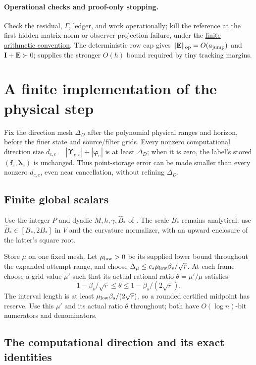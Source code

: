 \documentclass[11pt]{article}
\theoremstyle{remark}
\newcommand{\II}{\mathbf I}
\newcommand{\ff}{\mathbf f}
\newcommand{\llambda}{\boldsymbol{\lambda}}
\newcommand{\UUps}{\boldsymbol{\Upsilon}}
\newcommand{\EE}{\mathbf E}
\newcommand{\pphi}{\boldsymbol{\varphi}}
\newcommand{\norm}[1]{\lVert#1\rVert}
\begin{document}
\paragraph{Operational checks and proof-only stopping.}
Check the residual, $\Gamma$, ledger, and work operationally; kill the reference
at the first hidden matrix-norm or observer-projection failure, under the
\hyperref[par:ram30-finite-arithmetic]{finite arithmetic convention}.
The deterministic row cap gives $\norm{\EE}_{\rm op}=O(a_{\rm jump})$ and
$\II+\EE\succ0$;  supplies the stronger $O(h)$ bound
required by tiny tracking margins.

\section{A finite implementation of the physical step}
\label{sec:ram-finite-direction}

Fix the direction mesh $\Delta_D$ after the polynomial physical ranges and
horizon, before the finer state and source/filter grids.
Every nonzero computational direction size $d_{c,e}=|\UUps_{c,e}|+|\pphi_e|$ is at
least $\Delta_D$; when it is zero, the label's stored $(\ff_e,\llambda_e)$ is
unchanged.
Thus point-storage error can be made smaller than every nonzero $d_{c,e}$, even
near cancellation, without refining $\Delta_D$.

\subsection{Finite global scalars}

Use the integer $P$ and dyadic $M,h,\gamma,\widehat B_*$ of
.
The scale $B_*$ remains analytical: use $\widehat B_*\in[B_*,2B_*]$ in $V$ and
the curvature normalizer, with an upward enclosure of the latter's square root.

Store $\mu$ on one fixed mesh.
Let $\mu_{\rm low}>0$ be its supplied lower bound throughout the expanded
attempt range, and choose $\Delta_\mu\le c_\star\mu_{\rm low}\beta_s/\sqrt r$.
At each frame choose a grid value $\mu'$ such that its actual rational ratio
$\theta=\mu'/\mu$ satisfies
\[
 1-\beta_s/\sqrt r\le\theta
           \le1-\beta_s/(2\sqrt r).
\]
The interval length is at least $\mu_{\rm low}\beta_s/(2\sqrt r)$, so a rounded
certified midpoint has reserve.
Use this $\mu'$ and its actual ratio $\theta$ throughout; both have $O(\log
n)$-bit numerators and denominators.

\subsection{The computational direction and its exact identities}
\end{document}
